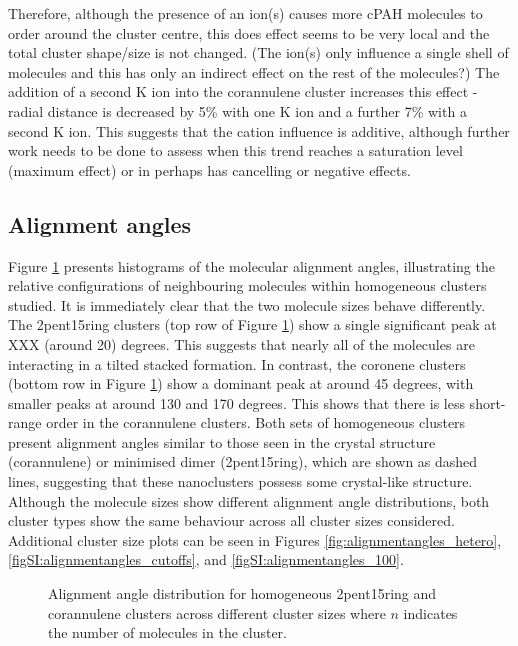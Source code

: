 Therefore, although the presence of an ion(s) causes more cPAH molecules to order around the cluster centre, this does effect seems to be very local and the total cluster shape/size is not changed.  (The ion(s) only influence a single shell of molecules and this has only an indirect effect on the rest of the molecules?)
The addition of a second K ion into the corannulene cluster increases this effect - radial distance is decreased by 5\% with one K ion and a further 7\% with a second K ion. This suggests that the cation influence is additive, although further work needs to be done to assess when this trend reaches a saturation level (maximum effect) or in perhaps has cancelling or negative effects.


\subsection{Alignment angles}

Figure \ref{fig:alignmentangles_homo} presents histograms of the molecular alignment angles, illustrating the relative configurations of neighbouring molecules within homogeneous clusters studied.
It is immediately clear that the two molecule sizes behave differently. The 2pent15ring clusters (top row of Figure \ref{fig:alignmentangles_homo}) show a single significant peak at XXX (around 20) degrees.  This suggests that nearly all of the molecules are interacting in a tilted stacked formation. In contrast, the coronene clusters (bottom row in Figure \ref{fig:alignmentangles_homo}) show a dominant peak at around 45 degrees, with smaller peaks at around 130 and 170 degrees. This shows that there is less short-range order in the corannulene clusters. Both sets of homogeneous clusters present alignment angles similar to those seen in the crystal structure (corannulene) or minimised dimer (2pent15ring), which are shown as dashed lines, suggesting that these nanoclusters possess some crystal-like structure.  Although the molecule sizes show different alignment angle distributions, both cluster types show the same behaviour across all cluster sizes considered. Additional cluster size plots can be seen in Figures \ref{fig:alignmentangles_hetero}, \ref{figSI:alignmentangles_cutoffs}, and \ref{figSI:alignmentangles_100}.
%
\begin{figure}[!tbh]
\centering
\caption{Alignment angle distribution for homogeneous 2pent15ring and corannulene clusters across different cluster sizes where $n$ indicates the number of molecules in the cluster.}
\label{fig:alignmentangles_homo}
\end{figure}
%

